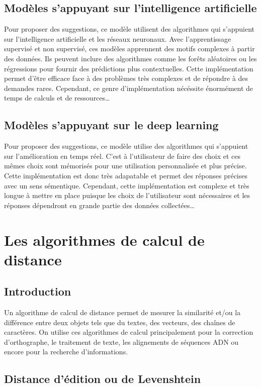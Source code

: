 \documentclass[a4paper, 11pt]{report}
\begin{document}
\section{Modèles s'appuyant sur l'intelligence artificielle}
Pour proposer des suggestions, ce modèle utilisent des algorithmes qui s'appuient sur l'intelligence artificielle et les réseaux neuronaux.
Avec l’apprentissage supervisé et non supervisé, ces modèles apprennent des motifs complexes à partir des données. Ils peuvent inclure des algorithmes comme les forêts aléatoires ou les régressions pour fournir des prédictions plus contextuelles.
Cette implémentation permet d'être efficace face à des problèmes très complexes et de répondre à des demandes rares. Cependant, ce genre d'implémentation nécéssite énormément de temps de calculs et de ressources\dots


\section{Modèles s'appuyant sur le deep learning}
Pour proposer des suggestions, ce modèle utilise des algorithmes qui s'appuient sur l'amélioration en temps réel. C'est à l'utilisateur de faire des choix et ces mêmes choix sont mémorisés pour une utilisation personnalisée et plus précise. Cette implémentation est donc très adapatable et permet des réponses précises avec un sens sémentique. Cependant, cette implémentation est complexe et très longue à mettre en place puisque les choix de l'utilisateur sont nécessaires et les réponses dépendront en grande partie des données collectées\dots



\chapter{Les algorithmes de calcul de distance}

\section{Introduction}

Un algorithme de calcul de distance permet de mesurer la similarité et/ou la différence entre deux objets tels que du textes, des vecteurs, des chaînes de caractères. On utilise ces algorithmes de calcul principalement pour la correction d'orthographe, le traitement de texte, les alignements de séquences ADN ou encore pour la recherche d'informations.

\section{Distance d'édition ou de Levenshtein}\label{sec:levenshtein}
\end{document}
